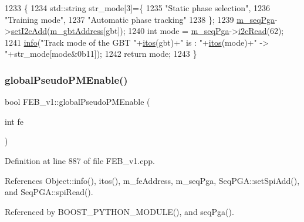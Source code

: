 \begin{DoxyCode}
1233                                  \{
1234   std::string str\_mode[3]=\{
1235     \textcolor{stringliteral}{"Static phase selection"},
1236     \textcolor{stringliteral}{"Training mode"},
1237     \textcolor{stringliteral}{"Automatic phase tracking"}
1238   \};
1239   \hyperlink{classFEB__v1_a6c7804ac86796f233a8393043adf2e77}{m\_seqPga}->\hyperlink{classSeqPGA_a4ef334e4d2cb417b49033dce951728cd}{setI2cAdd}(\hyperlink{classFEB__v1_ac625855df976f16694178f1a4c0eef1e}{m\_gbtAddress}[gbt]);
1240   \textcolor{keywordtype}{int} mode = \hyperlink{classFEB__v1_a6c7804ac86796f233a8393043adf2e77}{m\_seqPga}->\hyperlink{classSeqPGA_a7cd344df2be99f3a02b487f80e87b27e}{i2cRead}(62);
1241   \hyperlink{classObject_a644fd329ea4cb85f54fa6846484b84a8}{info}(\textcolor{stringliteral}{"Track mode of the GBT "}+\hyperlink{Tools_8h_af330027dbdafb9a30768b3613c553e60}{itos}(gbt)+\textcolor{stringliteral}{" is : "}+\hyperlink{Tools_8h_af330027dbdafb9a30768b3613c553e60}{itos}(mode)+\textcolor{stringliteral}{" -> "}+str\_mode[mode&0b11]); 
1242   \textcolor{keywordflow}{return} mode; 
1243 \}
\end{DoxyCode}
\mbox{\label{classFEB__v1_acfaf998ce0166362401e5253502a16d2}} 
\subsubsection{\texorpdfstring{global\+Pseudo\+P\+M\+Enable()}{globalPseudoPMEnable()}}
{\footnotesize\ttfamily bool F\+E\+B\+\_\+v1\+::global\+Pseudo\+P\+M\+Enable (\begin{DoxyParamCaption}\item[{int}]{fe }\end{DoxyParamCaption})}



Definition at line 887 of file F\+E\+B\+\_\+v1.\+cpp.



References Object\+::info(), itos(), m\+\_\+fe\+Address, m\+\_\+seq\+Pga, Seq\+P\+G\+A\+::set\+Spi\+Add(), and Seq\+P\+G\+A\+::spi\+Read().



Referenced by B\+O\+O\+S\+T\+\_\+\+P\+Y\+T\+H\+O\+N\+\_\+\+M\+O\+D\+U\+L\+E(), and seq\+Pga().


